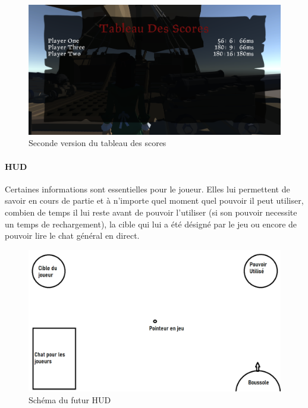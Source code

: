         \begin{figure}[hbt!]
        \centering
            \includegraphics[scale=0.29]{img/newscoreboard.PNG}
            \caption{Seconde version du tableau des scores}
        \end{figure}
        \FloatBarrier


        \paragraph{HUD}
            
            Certaines informations sont essentielles pour le joueur. Elles lui permettent de savoir en cours de partie et à n'importe quel moment quel pouvoir il peut utiliser, combien de temps il lui reste avant de pouvoir l'utiliser (si son pouvoir necessite un temps de rechargement), la cible qui lui a été désigné par le jeu ou encore de pouvoir lire le chat général en direct.
        

        \begin{figure}[hbt!]
                \centering
                \includegraphics[scale=0.3]{img/schem_hud.png}
                \caption{Schéma du futur HUD}
        \end{figure}
        \FloatBarrier
        

